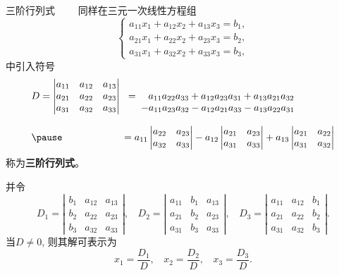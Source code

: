\documentclass[compress,mathserif,cjk]{beamer}
\theoremstyle{remark}
\numberwithin{equation}{section}
\newcommand{\hei}{\bf}      %
\begin{document}
\begin{CJK}{UTF8}{gbsn}
\begin{frame}{三阶行列式}
 \ \ \ \ 同样在三元一次线性方程组
 $$\left\{\begin{array}{l}
 a_{11}x_1+a_{12}x_2+a_{13}x_3=b_1,\\
 a_{21}x_1+a_{22}x_2+a_{23}x_3=b_2,\\
 a_{31}x_1+a_{32}x_2+a_{33}x_3=b_3,
 \end{array}\right.$$
 中引入符号
 $$\begin{array}{l}
 D=\left|\begin{matrix}a_{11}&a_{12}&a_{13}\\a_{21}&a_{22}&a_{23}\\a_{31}&a_{32}&a_{33}\end{matrix}\right|
   \begin{matrix}\\~~=~~~a_{11}a_{22}a_{33}+a_{12}a_{23}a_{31}+a_{13}a_{21}a_{32}\\~~~~~~-a_{11}a_{23}a_{32}-a_{12}a_{21}a_{33}-a_{13}a_{22}a_{31}\end{matrix}\\\\
 \pause\hspace{6em}=a_{11}\left|\begin{matrix}a_{22}&a_{23}\\a_{32}&a_{33}\end{matrix}\right|-a_{12}\left|\begin{matrix}a_{21}&a_{23}\\a_{31}&a_{33}\end{matrix}\right|
          +a_{13}\left|\begin{matrix}a_{21}&a_{22}\\a_{31}&a_{32}\end{matrix}\right|
 \end{array}$$
 称为{\hei 三阶行列式}。
\end{frame}

\begin{frame}
并令
$$D_1=\left|\begin{matrix}b_1&a_{12}&a_{13}\\b_2&a_{22}&a_{23}\\b_3&a_{32}&a_{33}\end{matrix}\right|,~~~~
D_2=\left|\begin{matrix}a_{11}&b_1&a_{13}\\a_{21}&b_2&a_{23}\\a_{31}&b_3&a_{33}\end{matrix}\right|,~~~~
D_3=\left|\begin{matrix}a_{11}&a_{12}&b_1\\a_{21}&a_{22}&b_2\\a_{31}&a_{32}&b_3\end{matrix}\right|.$$
当$D\neq0$, 则其解可表示为
$$x_1=\frac{D_1}D,~~~~x_2=\frac{D_2}D,~~~~x_3=\frac{D_3}D.$$
\end{frame}


\end{CJK}
\end{document}
